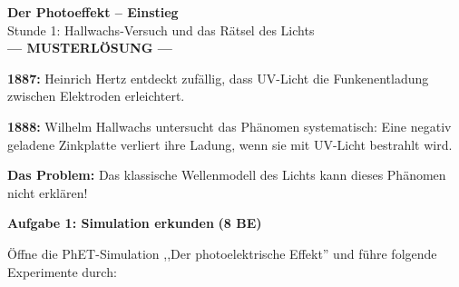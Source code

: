 \documentclass[11pt,a4paper]{article}
\begin{document}
\begin{center}
{\Large\textbf{Der Photoeffekt -- Einstieg}}\\[0.3em]
{\normalsize Stunde 1: Hallwachs-Versuch und das Rätsel des Lichts}\\[0.3em]
{\large\textcolor{loesung}{\textbf{--- MUSTERLÖSUNG ---}}}
\end{center}

\vspace{0.5em}


\begin{tcolorbox}[merkbox={Historischer Hintergrund}]
\textbf{1887:} Heinrich Hertz entdeckt zufällig, dass UV-Licht die Funkenentladung zwischen Elektroden erleichtert.

\textbf{1888:} Wilhelm Hallwachs untersucht das Phänomen systematisch: Eine negativ geladene Zinkplatte verliert ihre Ladung, wenn sie mit UV-Licht bestrahlt wird.

\textbf{Das Problem:} Das klassische Wellenmodell des Lichts kann dieses Phänomen nicht erklären!
\end{tcolorbox}

\vspace{0.5em}


\textbf{Aufgabe 1: Simulation erkunden} \hfill \textbf{(8 BE)}

Öffne die PhET-Simulation ,,Der photoelektrische Effekt'' und führe folgende Experimente durch:
\end{document}
